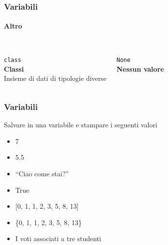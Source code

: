 \begin{contentframe}
    \frametitle{Variabili}
    \framesubtitle{Altro}

    \begin{columns}
        \centering
        {\Huge\faSitemap}\\
        \bigskip
        \texttt{class}\\
        \textbf{Classi}\\
        \bigskip
        Insieme di dati di tipologie diverse

        \centering
        {\Huge\faTimes}\\
        \bigskip
        \texttt{None}\\
        \textbf{Nessun valore}\\
        \bigskip
        \bigskip
    \end{columns}
\end{contentframe}

\begin{exerciseframe}
    \frametitle{Variabili}

    Salvare in una variabile e stampare i seguenti valori
    \begin{itemize}
        \item 7\pause
        \item 5.5\pause
        \item ``Ciao come stai?''\pause
        \item True\pause
        \item{} [0, 1, 1, 2, 3, 5, 8, 13]\pause
        \item \{0, 1, 1, 2, 3, 5, 8, 13\}\pause
        \item I voti associati a tre studenti
    \end{itemize}
\end{exerciseframe}

